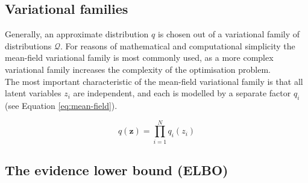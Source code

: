 \subsection{Variational families}

\par Generally, an approximate distribution $q$ is chosen out of a variational family of distributions $\mathcal{Q}$. For reasons of mathematical and computational simplicity the mean-field variational family is most commonly used, as a more complex variational family increases the complexity of the optimisation problem.
\\
The most important characteristic of the mean-field variational family is that all latent variables $z_i$ are independent, and each is modelled by a separate factor $q_i$ (see Equation \ref{eq:mean-field}).

\begin{equation}
    \label{eq:mean-field}
    q(\bm{z}) = \prod^{N}_{i=1}{q_i(z_i)}
\end{equation}
    

\subsection{The evidence lower bound (ELBO) \parencite{vi-review}}

